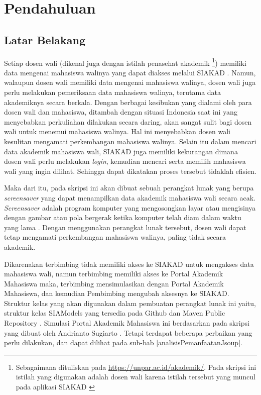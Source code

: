 \chapter{Pendahuluan}
\label{chap:intro}
   
\section{Latar Belakang}
\label{sec:label}

Setiap dosen wali (dikenal juga dengan istilah penasehat akademik \footnote{Sebagaimana dituliskan pada \url{https://unpar.ac.id/akademik/}. Pada skripsi ini istilah yang digunakan adalah dosen wali karena istilah tersebut yang muncul pada aplikasi SIAKAD \cite{siakad}}) memiliki data mengenai mahasiswa walinya yang dapat diakses melalui SIAKAD \cite{siakad}. Namun, walaupun dosen wali memiliki data mengenai mahasiswa walinya, dosen wali juga perlu melakukan pemeriksaan data mahasiswa walinya, terutama data akademiknya secara berkala. Dengan berbagai kesibukan yang dialami oleh para dosen wali dan mahasiswa, ditambah dengan situasi Indonesia saat ini yang menyebabkan perkuliahan dilakukan secara daring, akan sangat sulit bagi dosen wali untuk menemui mahasiswa walinya. Hal ini menyebabkan dosen wali kesulitan mengamati perkembangan mahasiswa walinya. Selain itu dalam mencari data akademik mahasiswa wali, SIAKAD juga memiliki kekurangan dimana dosen wali perlu melakukan \textit{login}, kemudian mencari serta memilih mahasiswa wali yang ingin dilihat. Sehingga dapat dikatakan proses tersebut tidaklah efisien.

Maka dari itu, pada skripsi ini akan dibuat sebuah perangkat lunak yang berupa \textit{screensaver} yang dapat menampilkan data akademik mahasiswa wali secara acak. \textit{Screensaver} adalah program komputer yang mengosongkan layar atau mengisinya dengan gambar atau pola bergerak ketika komputer telah diam dalam waktu yang lama \cite{screensaver}. Dengan menggunakan perangkat lunak tersebut, dosen wali dapat tetap mengamati perkembangan mahasiswa walinya, paling tidak secara akademik.

Dikarenakan terbimbing tidak memiliki akses ke SIAKAD untuk mengakses data mahasiswa wali, namun terbimbing memiliki akses ke Portal Akademik Mahasiswa \cite{stupor} maka, terbimbing mensimulasikan dengan Portal Akademik Mahasiswa, dan kemudian Pembimbing mengubah aksesnya ke SIAKAD. Struktur kelas yang akan digunakan dalam pembuatan perangkat lunak ini yaitu, struktur kelas SIAModels yang tersedia pada Github dan Maven Public Repository \cite{siamodels}. Simulasi Portal Akademik Mahasiswa ini berdasarkan pada skripsi yang dibuat oleh Andrianto Sugiarto \cite{ifstupor}. Tetapi terdapat beberapa perbaikan yang perlu dilakukan, dan dapat dilihat pada sub-bab \ref{analisisPemanfaatanJsoup}.


